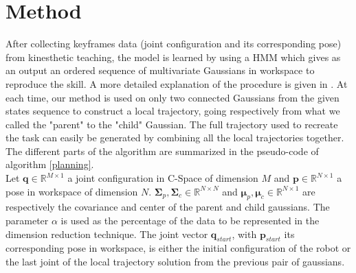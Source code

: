 \documentclass[letterpaper, 10 pt, conference]{ieeeconf}  %
\newcommand{\mb}[1]{{\boldsymbol{#1}}}
\begin{document}
\section{Method}
After collecting keyframes data (joint configuration and its corresponding pose) from kinesthetic teaching, the model is learned by using a HMM which gives as an output an ordered sequence of multivariate Gaussians in workspace to reproduce the skill. A more detailed explanation of the procedure is given in \cite{KeyframesSelfLearning}.
 At each time, our method is used on only two connected Gaussians from the given states sequence to construct a local trajectory, going respectively from what we called the "parent" to the "child" Gaussian. The full trajectory used to recreate the task can easily be generated by combining all the local trajectories together.
The different parts of the algorithm are summarized in the pseudo-code of algorithm \ref{planning}. \\

Let $\mb{q} \in \mathbb{R}^{M \times 1}$ a joint configuration in C-Space of dimension $M$  and $\mb{p} \in \mathbb{R}^{N \times 1}$ a pose in workspace of dimension $N$. $\mb{\Sigma}_{p} , \mb{\Sigma}_{c} \in \mathbb{R}^{N \times N}$  and $\mb{\mu}_{p} , \mb{\mu}_{c} \in \mathbb{R}^{N \times 1}$ are respectively the covariance and center of the parent and child gaussians.
The parameter $\alpha$ is used as the percentage of the data to be represented in the dimension reduction technique. The joint vector $\mb{q}_{start}$, with $\mb{p}_{start}$ its corresponding pose in workspace, is either the initial configuration of the robot or the last joint of the local trajectory solution from the previous pair of gaussians. \\
\end{document}

